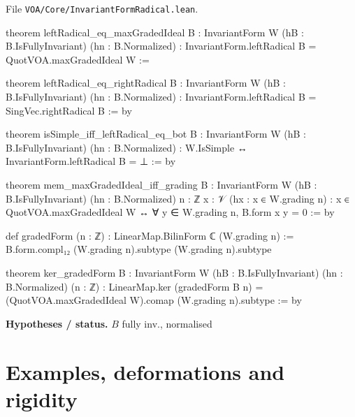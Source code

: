 \documentclass[11pt,openany]{book}
\newcommand{\leanpath}[1]{\texttt{\small #1}}
\theoremstyle{definition}
\theoremstyle{plain}
\begin{document}
{\raggedright\noindent File \leanpath{VOA/\allowbreak Core/\allowbreak InvariantFormRadical.lean}.\par}
\begin{leancode}
theorem leftRadical_eq_maxGradedIdeal {B : InvariantForm W} (hB : B.IsFullyInvariant)
    (hn : B.Normalized) :
    InvariantForm.leftRadical B = QuotVOA.maxGradedIdeal W :=

theorem leftRadical_eq_rightRadical {B : InvariantForm W} (hB : B.IsFullyInvariant)
    (hn : B.Normalized) :
    InvariantForm.leftRadical B = SingVec.rightRadical B := by

theorem isSimple_iff_leftRadical_eq_bot {B : InvariantForm W} (hB : B.IsFullyInvariant)
    (hn : B.Normalized) :
    W.IsSimple ↔ InvariantForm.leftRadical B = ⊥ := by

theorem mem_maxGradedIdeal_iff_grading {B : InvariantForm W} (hB : B.IsFullyInvariant)
    (hn : B.Normalized) {n : ℤ} {x : 𝒱} (hx : x ∈ W.grading n) :
    x ∈ QuotVOA.maxGradedIdeal W ↔ ∀ y ∈ W.grading n, B.form x y = 0 := by

def gradedForm (n : ℤ) : LinearMap.BilinForm ℂ (W.grading n) :=
  B.form.compl₁₂ (W.grading n).subtype (W.grading n).subtype

theorem ker_gradedForm {B : InvariantForm W} (hB : B.IsFullyInvariant) (hn : B.Normalized)
    (n : ℤ) :
    LinearMap.ker (gradedForm B n) = (QuotVOA.maxGradedIdeal W).comap (W.grading n).subtype := by
\end{leancode}
\noindent\textbf{Hypotheses / status.} $B$ fully inv., normalised\par
\medskip
\endgroup
\part{Examples, deformations and rigidity}
\setcounter{chapter}{5}
\end{document}
